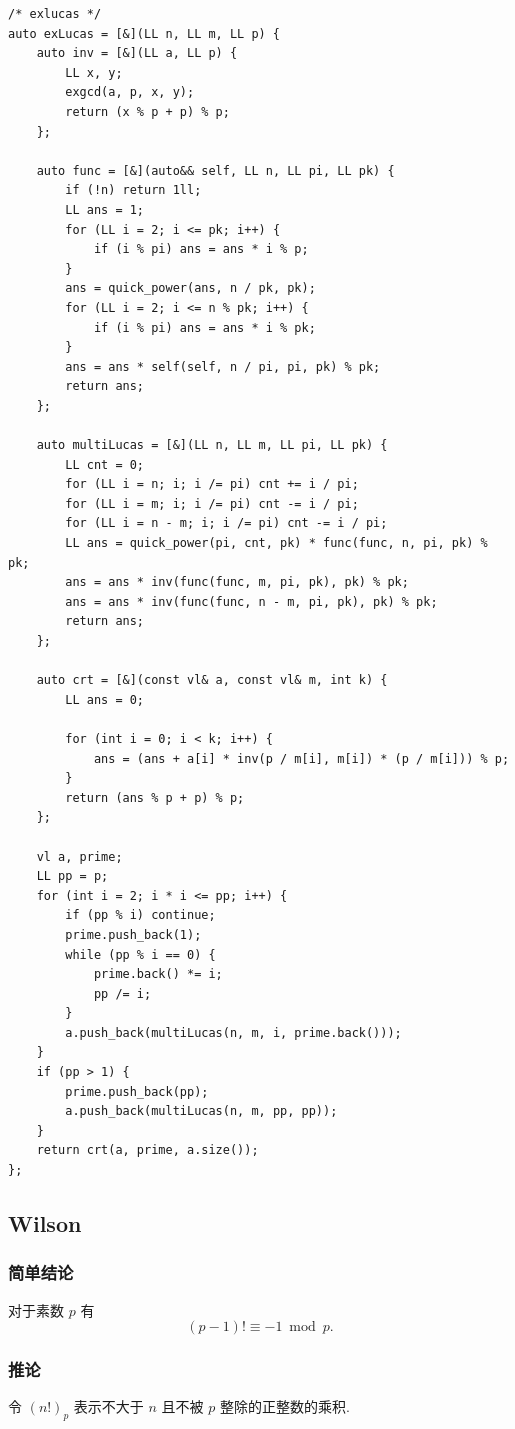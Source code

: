 \documentclass[UTF8, a4paper, titlepage, twoside]{ctexart}
\begin{document}
\begin{lstlisting}[style=cpp]
/* exlucas */
auto exLucas = [&](LL n, LL m, LL p) {
    auto inv = [&](LL a, LL p) {
        LL x, y;
        exgcd(a, p, x, y);
        return (x % p + p) % p;
    };

    auto func = [&](auto&& self, LL n, LL pi, LL pk) {
        if (!n) return 1ll;
        LL ans = 1;
        for (LL i = 2; i <= pk; i++) {
            if (i % pi) ans = ans * i % p;
        }
        ans = quick_power(ans, n / pk, pk);
        for (LL i = 2; i <= n % pk; i++) {
            if (i % pi) ans = ans * i % pk;
        }
        ans = ans * self(self, n / pi, pi, pk) % pk;
        return ans;
    };

    auto multiLucas = [&](LL n, LL m, LL pi, LL pk) {
        LL cnt = 0;
        for (LL i = n; i; i /= pi) cnt += i / pi;
        for (LL i = m; i; i /= pi) cnt -= i / pi;
        for (LL i = n - m; i; i /= pi) cnt -= i / pi;
        LL ans = quick_power(pi, cnt, pk) * func(func, n, pi, pk) % pk;
        ans = ans * inv(func(func, m, pi, pk), pk) % pk;
        ans = ans * inv(func(func, n - m, pi, pk), pk) % pk;
        return ans;
    };

    auto crt = [&](const vl& a, const vl& m, int k) {
        LL ans = 0;

        for (int i = 0; i < k; i++) {
            ans = (ans + a[i] * inv(p / m[i], m[i]) * (p / m[i])) % p;
        }
        return (ans % p + p) % p;
    };

    vl a, prime;
    LL pp = p;
    for (int i = 2; i * i <= pp; i++) {
        if (pp % i) continue;
        prime.push_back(1);
        while (pp % i == 0) {
            prime.back() *= i;
            pp /= i;
        }
        a.push_back(multiLucas(n, m, i, prime.back()));
    }
    if (pp > 1) {
        prime.push_back(pp);
        a.push_back(multiLucas(n, m, pp, pp));
    }
    return crt(a, prime, a.size());
};
\end{lstlisting}

\subsection{ Wilson }
\subsubsection*{ 简单结论 }

对于素数 \(p\) 有 \[(p - 1)!\equiv-1\bmod p.\]

\subsubsection*{ 推论 }
令 \((n!)_p\) 表示不大于 \(n\) 且不被 \(p\) 整除的正整数的乘积.
\end{document}
